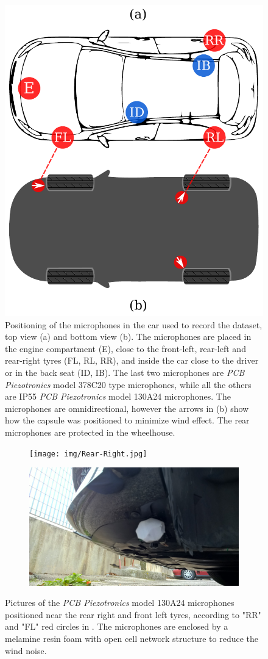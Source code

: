 \begin{figure}[ht]
	\centering
	\includegraphics[width=0.4\linewidth]{img/car-mic}
	\caption[Car Equipment for Dataset Recording]{Positioning of the microphones in the car used to record the dataset, top view (a) and bottom view (b). The microphones are placed in the engine compartment (E), close to the front-left, rear-left and rear-right tyres (FL, RL, RR), and inside the car close to the driver or in the back seat (ID, IB). The last two microphones are \textit{PCB Piezotronics} model 378C20 type microphones, while all the others are IP55 \textit{PCB Piezotronics} model 130A24 microphones. The microphones are omnidirectional, however the arrows in (b) show how the capsule was positioned to minimize wind effect. The rear microphones are protected in the wheelhouse.}
	\label{fig:car-mic}
\end{figure}

\begin{figure}[t]
	\centering
	\begin{subfigure}[b]{0.48\textwidth}
		\texttt{[image: img/Rear-Right.jpg]}
	\end{subfigure}
	\hfil
	\begin{subfigure}[b]{0.48\textwidth}
		\includegraphics[width=\textwidth]{img/Front-Left.jpg}
	\end{subfigure}
	
	
	\caption[Microphones Positioning]{Pictures of the \textit{PCB Piezotronics} model 130A24 microphones positioned near the rear right and front left tyres, according to "RR" and "FL" red circles in . The microphones are enclosed by a melamine resin foam with open cell network structure to reduce the wind noise.}
	\label{fig:car-rr-and-fl}
\end{figure}


